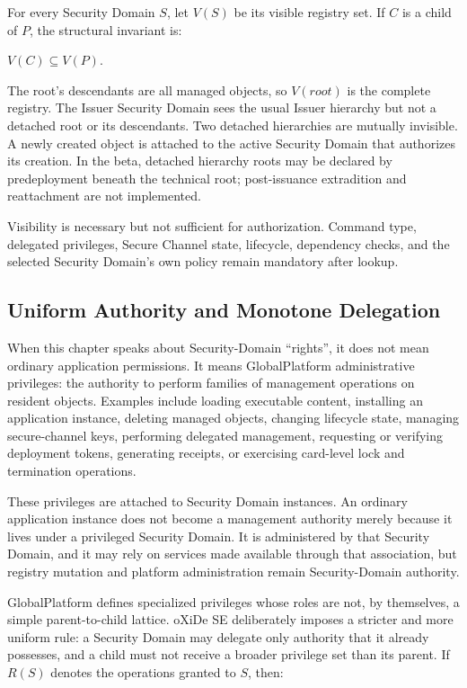 For every Security Domain $S$, let $V(S)$ be its visible registry set. If $C$
is a child of $P$, the structural invariant is:

\begin{center}
$V(C) \subseteq V(P)$.
\end{center}

The root's descendants are all managed objects, so $V(root)$ is the complete
registry. The Issuer Security Domain sees the usual Issuer hierarchy but not a
detached root or its descendants. Two detached hierarchies are mutually
invisible. A newly created object is attached to the active Security Domain
that authorizes its creation. In the beta, detached hierarchy roots may be
declared by predeployment beneath the technical root; post-issuance
extradition and reattachment are not implemented.

Visibility is necessary but not sufficient for authorization. Command type,
delegated privileges, Secure Channel state, lifecycle, dependency checks, and
the selected Security Domain's own policy remain mandatory after lookup.

\subsection{Uniform Authority and Monotone Delegation}
\label{sec:gp-privilege-delegation}

When this chapter speaks about Security-Domain ``rights'', it does not mean
ordinary application permissions. It means GlobalPlatform administrative
privileges: the authority to perform families of management operations on
resident objects. Examples include loading executable content, installing an
application instance, deleting managed objects, changing lifecycle state,
managing secure-channel keys, performing delegated management, requesting or
verifying deployment tokens, generating receipts, or exercising card-level
lock and termination operations.

These privileges are attached to Security Domain instances. An ordinary
application instance does not become a management authority merely because it
lives under a privileged Security Domain. It is administered by that Security
Domain, and it may rely on services made available through that association,
but registry mutation and platform administration remain Security-Domain
authority.

GlobalPlatform defines specialized privileges whose roles are not, by
themselves, a simple parent-to-child lattice. oXiDe SE deliberately imposes a
stricter and more uniform rule: a Security Domain may delegate only authority
that it already possesses, and a child must not receive a broader privilege
set than its parent. If $R(S)$ denotes the operations granted to $S$, then:

